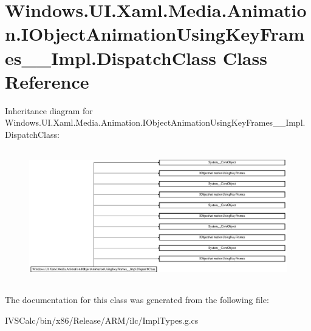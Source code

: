 \hypertarget{class_windows_1_1_u_i_1_1_xaml_1_1_media_1_1_animation_1_1_i_object_animation_using_key_frames_____impl_1_1_dispatch_class}{}\section{Windows.\+U\+I.\+Xaml.\+Media.\+Animation.\+I\+Object\+Animation\+Using\+Key\+Frames\+\_\+\+\_\+\+Impl.\+Dispatch\+Class Class Reference}
\label{class_windows_1_1_u_i_1_1_xaml_1_1_media_1_1_animation_1_1_i_object_animation_using_key_frames_____impl_1_1_dispatch_class}
Inheritance diagram for Windows.\+U\+I.\+Xaml.\+Media.\+Animation.\+I\+Object\+Animation\+Using\+Key\+Frames\+\_\+\+\_\+\+Impl.\+Dispatch\+Class\+:\begin{figure}[H]
\begin{center}
\leavevmode
\includegraphics[height=5.822306cm]{class_windows_1_1_u_i_1_1_xaml_1_1_media_1_1_animation_1_1_i_object_animation_using_key_frames_____impl_1_1_dispatch_class}
\end{center}
\end{figure}


The documentation for this class was generated from the following file\+:\begin{DoxyCompactItemize}
\item 
I\+V\+S\+Calc/bin/x86/\+Release/\+A\+R\+M/ilc/Impl\+Types.\+g.\+cs\end{DoxyCompactItemize}
